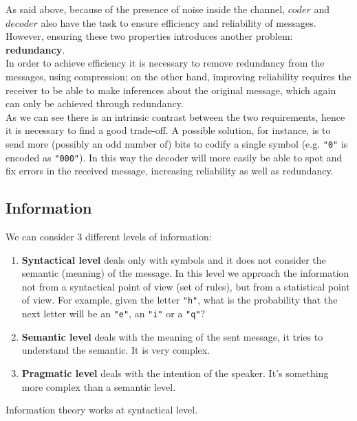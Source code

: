 As said above, because of the presence of noise inside the channel, $coder$ and $decoder$ also have the task to ensure efficiency and reliability of messages. However, ensuring these two properties introduces another problem: \textbf{redundancy}.\\
In order to achieve efficiency it is necessary to remove redundancy from the messages, using compression; on the other hand, improving reliability requires the receiver to be able to make inferences about the original message, which again can only be achieved through redundancy.\\
As we can see there is an intrinsic contrast between the two requirements, hence it is necessary to find a good trade-off. A possible solution, for instance, is to send more (possibly an odd number of) bits to codify a single symbol (e.g. \verb|"0"| is encoded as \verb|"000"|). In this way the decoder will more easily be able to spot and fix errors in the received message, increasing reliability as well as redundancy.

\subsection{Information}
We can consider 3 different levels of information:
\begin{enumerate}
	\item \textbf{Syntactical level} deals only with symbols and it does not consider the semantic (meaning) of the message. In this level we approach the information not from a syntactical point of view (set of rules), but from a statistical point of view. For example, given the letter \verb|"h"|, what is the probability that the next letter will be an \verb|"e"|, an \verb|"i"| or a \verb|"q"|?
	\item \textbf{Semantic level} deals with the meaning of the sent message, it tries to understand the semantic. It is very complex.
	\item \textbf{Pragmatic level} deals with the intention of the speaker. It's something more complex than a semantic level.
\end{enumerate}
Information theory works at syntactical level.
\par \bigskip \noindent

